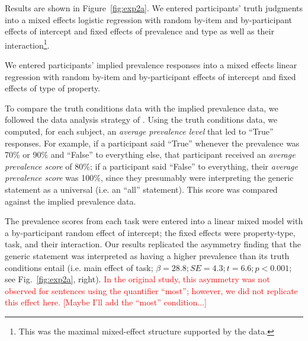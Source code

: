 \documentclass[10pt,letterpaper]{article}
\newcommand{\red}[1]{\textcolor{Red}{#1}}
\begin{document}
Results are shown in Figure~\ref{fig:exp2a}. We entered participants' truth judgments into a mixed effects logistic regression with random by-item and by-participant effects of intercept and fixed effects of prevalence and type as well as their interaction\footnote{This was the maximal mixed-effect structure supported by the data.}.  
%

We entered participants' implied prevalence responses into a mixed effects linear regression with random by-item and by-participant effects of intercept and fixed effects of type of property.

To compare the truth conditions data with the implied prevalence data, we followed the data analysis strategy of \citeauthor{Cimpian2010}. Using the truth conditions data, we computed, for each subject, an \emph{average prevalence level} that led to ``True'' responses. For example, if a participant said ``True'' whenever the prevalence was 70\% or 90\% and ``False'' to everything else, that participant received an \emph{average prevalence score} of 80\%; if a participant said ``False'' to everything, their \emph{average prevalence score} was 100\%, since they presumably were interpreting the generic statement as a universal (i.e. an ``all'' statement). This score was compared against the implied prevalence data.

The prevalence scores from each task were entered into a linear mixed model with a by-participant random effect of intercept; the fixed effects were property-type, task, and their interaction. Our results replicated the asymmetry finding that the generic statement was interpreted as having a higher prevalence than its truth conditions entail (i.e. main effect of task; $\beta=28.8; SE = 4.3; t=6.6; p < 0.001$; see Fig.~\ref{fig:exp2a}, right). \red{In the original study, this asymmetry was not observed for sentences using the quantifier ``most''; however, we did not replicate this effect here. [Maybe I'll add the ``most'' condition...]}
\end{document}
